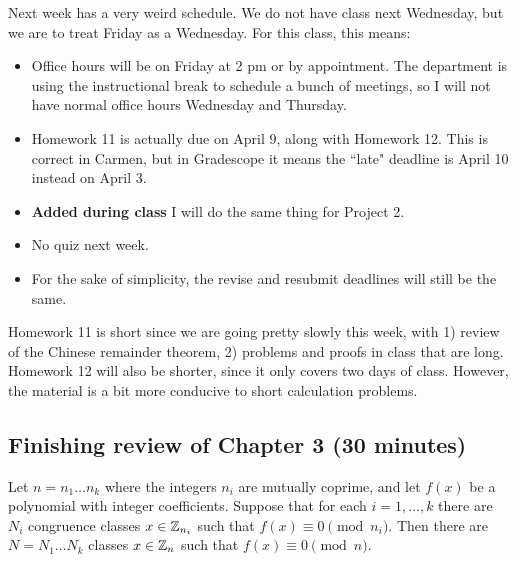\documentclass[letterpaper, 11 pt]{article}
\begin{document}
Next week has a very weird schedule. We do not have class next Wednesday, but we are to treat Friday as a Wednesday. For this class, this means:

\begin{itemize}
 \item Office hours will be on Friday at 2 pm or by appointment. The department is using the instructional break to schedule a bunch of meetings, so I will not have normal office hours Wednesday and Thursday.
 \item Homework 11 is actually due on April 9, along with Homework 12. This is correct in Carmen, but in Gradescope it means the ``late" deadline is April 10 instead on April 3.
 \item {\bf Added during class} I will do the same thing for Project 2.
 \item No quiz next week.
\item For the sake of simplicity, the revise and resubmit deadlines will still be the same.
\end{itemize}

Homework 11 is short since we are going pretty slowly this week, with 1) review of the Chinese remainder theorem, 2) problems and proofs in class that are long. Homework 12 will also be shorter, since it only covers two days of class. However, the material is a bit more conducive to short calculation problems.
\subsection{Finishing review of Chapter 3 (30 minutes)}

\begin{thm}[Theorem 3.11] 
Let $n = n_1 \dots n_k$ where the integers $n_i$ are mutually coprime, and let $f(x)$ be a polynomial with integer coefficients. Suppose that for each $i = 1, \dots , k$ there are $N_i$ congruence classes $x \in\mathbb Z_{n_i}$ such that $f(x) \equiv 0 \pmod{n_i}$. Then there are $N = N_1 \dots N_k$ classes $x \in \mathbb Z_n$ such that $f(x) \equiv0\pmod n.$
\end{thm}
\end{document}
